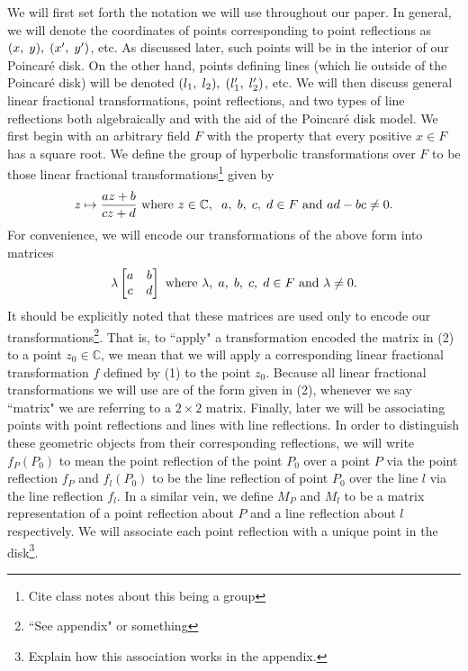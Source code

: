 \documentclass[12pt]{article}
\newcommand{\C}{\mathbb{C}}
\newcommand{\poincare}{Poincar\'{e} }
\newcommand{\ttc}{, \hspace{1mm}}
\newcommand{\lftmat}[4]{\begin{bmatrix} {#1} & {#2} \\ {#3} & {#4} \end{bmatrix}}
\newcommand{\stanlftmat}{\lftmat{a}{b}{c}{d}}
\theoremstyle{plain}
\theoremstyle{definition}
\begin{document}
We will first set forth the notation we will use throughout our paper. In general, we will denote the coordinates of points corresponding to point reflections as $(x \ttc y) \ttc (x' \ttc y')$, etc. As discussed later, such points will be in the interior of our \poincare disk. On the other hand, points defining lines (which lie outside of the \poincare disk) will be denoted $(l_1 \ttc l_2) \ttc (l_1' \ttc l_2')$, etc. We will then discuss general linear fractional transformations, point reflections, and two types of line reflections both algebraically and with the aid of the \poincare disk model. We first begin with an arbitrary field $F$ with the property that every positive $x \in F$ has a square root. We define the group of hyperbolic transformations over $F$ to be those linear fractional transformations\footnote{Cite class notes about this being a group} given by
\begin{equation} 
	z \mapsto \frac{az+b}{cz+d} \text{ where } z \in \C, \hspace{2mm} a \ttc b \ttc c \ttc d \in F \text{ and } ad-bc \neq 0. 
\end{equation}
For convenience, we will encode our transformations of the above form into matrices
\begin{equation}
	\lambda \stanlftmat \text{ where } \lambda \ttc a \ttc b \ttc c \ttc d \in F \text{ and } \lambda \neq 0. 
\end{equation}
It should be explicitly noted that these matrices are used only to encode our transformations\footnote{``See appendix" or something}. That is, to ``apply" a transformation encoded the matrix in (2) to a point $z_0 \in \C$, we mean that we will apply a corresponding linear fractional transformation $f$ defined by (1) to the point $z_0$. Because all linear fractional transformations we will use are of the form given in (2), whenever we say ``matrix" we are referring to a $2 \times 2$ matrix. Finally, later we will be associating points with point reflections and lines with line reflections. In order to distinguish these geometric objects from their corresponding reflections, we will write $f_P(P_0)$ to mean the point reflection of the point $P_0$ over a point $P$ via the point reflection $f_P$ and $f_l(P_0)$ to be the line reflection of point $P_0$ over the line $l$ via the line reflection $f_l$. In a similar vein, we define $M_P$ and $M_l$ to be a matrix representation of a point reflection about $P$ and a line reflection about $l$ respectively. We will associate each point reflection with a unique point in the disk\footnote{Explain how this association works in the appendix.}. 
\end{document}
